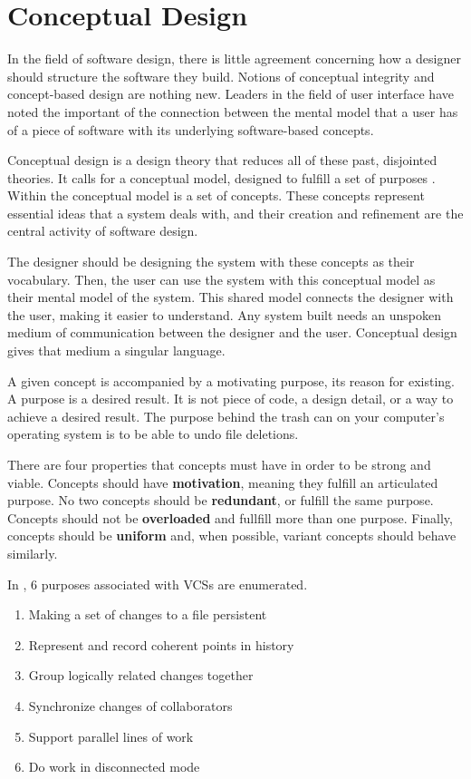 \section{Conceptual Design}

In the field of software design, there is little agreement concerning how a designer should structure the software they build. Notions of conceptual integrity and concept-based design are nothing new. Leaders in the field of user interface have noted the important of the connection between the mental model that a user has of a piece of software with its underlying software-based concepts. 

Conceptual design is a design theory that reduces all of these past, disjointed theories. It calls for a conceptual model, designed to fulfill a set of purposes \cite{Jackson}. Within the conceptual model is a set of concepts. These concepts represent essential ideas that a system deals with, and their creation and refinement are the central activity of software design.

The designer should be designing the system with these concepts as their vocabulary. Then, the user can use the system with this conceptual model as their mental model of the system. This shared model connects the designer with the user, making it easier to understand. Any system built needs an unspoken medium of communication between the designer and the user. Conceptual design gives that medium a singular language.

A given concept is accompanied by a motivating purpose, its reason for existing. A purpose is a desired result. It is not piece of code, a design detail, or a way to achieve a desired result. The purpose behind the trash can on your computer's operating system is to be able to undo file deletions.

There are four properties that concepts must have in order to be strong and viable. Concepts should have \textbf{motivation}, meaning they fulfill an articulated purpose. No two concepts should be \textbf{redundant}, or fulfill the same purpose. Concepts should not be \textbf{overloaded} and fullfill more than one purpose. Finally, concepts should be \textbf{uniform} and, when possible, variant concepts should behave similarly.

In \cite{RossoJackson}, 6 purposes associated with VCSs are enumerated.
\begin{enumerate}
  \item{Making a set of changes to a file persistent}
  \item{Represent and record coherent points in history}
  \item{Group logically related changes together}
  \item{Synchronize changes of collaborators}
  \item{Support parallel lines of work}
  \item{Do work in disconnected mode}
\end{enumerate}

